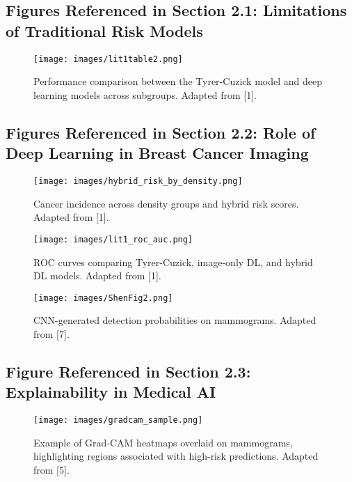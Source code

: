 \documentclass[12pt]{article}
\begin{document}
\subsection{Figures Referenced in Section 2.1: Limitations of Traditional Risk Models}

\begin{figure}[H]
    \centering
    \texttt{[image: images/lit1table2.png]}
    \caption{Performance comparison between the Tyrer-Cuzick model and deep learning models across subgroups. Adapted from [1].}
    \label{fig:lit1table2}
\end{figure}

\subsection{Figures Referenced in Section 2.2: Role of Deep Learning in Breast Cancer Imaging}

\begin{figure}[H]
    \centering
    \texttt{[image: images/hybrid\_risk\_by\_density.png]}
    \caption{Cancer incidence across density groups and hybrid risk scores. Adapted from [1].}
    \label{fig:hybrid_density}
\end{figure}

\begin{figure}[H]
    \centering
    \texttt{[image: images/lit1\_roc\_auc.png]}
    \caption{ROC curves comparing Tyrer-Cuzick, image-only DL, and hybrid DL models. Adapted from [1].}
    \label{fig:lit1roc}
\end{figure}

\begin{figure}[H]
    \centering
    \texttt{[image: images/ShenFig2.png]}
    \caption{CNN-generated detection probabilities on mammograms. Adapted from [7].}
    \label{fig:shen2019}
\end{figure}

\subsection{Figure Referenced in Section 2.3: Explainability in Medical AI}

\begin{figure}[H]
    \centering
    \texttt{[image: images/gradcam\_sample.png]}
    \caption{Example of Grad-CAM heatmaps overlaid on mammograms, highlighting regions associated with high-risk predictions. Adapted from [5].}
    \label{fig:gradcam}
\end{figure}
\end{document}
